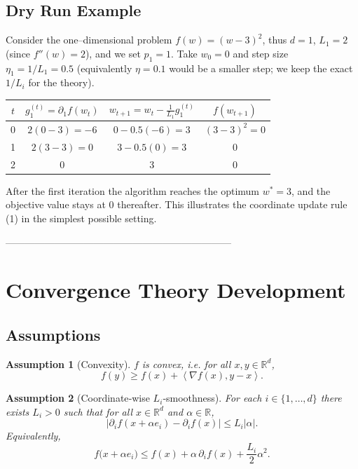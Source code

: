 \documentclass{article}
\newtheorem{assumption}{Assumption}
\newcommand{\R}{\mathbb{R}}
\newcommand{\ip}[2]{\left\langle #1,#2\right\rangle}
\newcommand{\grad}{\nabla}
\begin{document}
\subsection*{Dry Run Example}
Consider the one–dimensional problem $f(w)=(w-3)^2$, thus $d=1$, $L_1=2$ (since $f''(w)=2$), and we set $p_1=1$.  
Take $w_0=0$ and step size $\eta_1=1/L_1=0.5$ (equivalently $\eta=0.1$ would be a smaller step; we keep the exact $1/L_i$ for the theory).  

\begin{center}
\begin{tabular}{c|c|c|c}
$t$ & $g_{1}^{(t)}=\partial_1 f(w_t)$ & $w_{t+1}=w_t-\frac{1}{L_1}g_{1}^{(t)}$ & $f(w_{t+1})$\\ \hline
0 & $2(0-3)=-6$ & $0-0.5(-6)=3$ & $(3-3)^2=0$\\
1 & $2(3-3)=0$   & $3-0.5(0)=3$                & $0$\\
2 & $0$          & $3$                         & $0$
\end{tabular}
\end{center}
After the first iteration the algorithm reaches the optimum $w^{*}=3$, and the objective value stays at $0$ thereafter.  This illustrates the coordinate update rule (1) in the simplest possible setting.

---------------------------------------------------------------------

\section*{Convergence Theory Development}

\subsection*{Assumptions}
\begin{assumption}[Convexity]\label{as:convex}
$f$ is convex, i.e. for all $x,y\in\R^{d}$,
\[
f(y)\ge f(x)+\ip{\grad f(x)}{y-x}.
\]
\end{assumption}

\begin{assumption}[Coordinate‑wise $L_i$‑smoothness]\label{as:smooth}
For each $i\in\{1,\dots ,d\}$ there exists $L_i>0$ such that for all $x\in\R^{d}$ and $\alpha\in\R$,
\[
\big|\partial_i f(x+\alpha e_i)-\partial_i f(x)\big|\le L_i|\alpha|.
\tag{2}
\]
Equivalently,
\[
f\big(x+\alpha e_i\big)\le f(x)+\alpha\,\partial_i f(x)+\frac{L_i}{2}\alpha^{2}.
\tag{3}
\]
\end{assumption}
\end{document}

